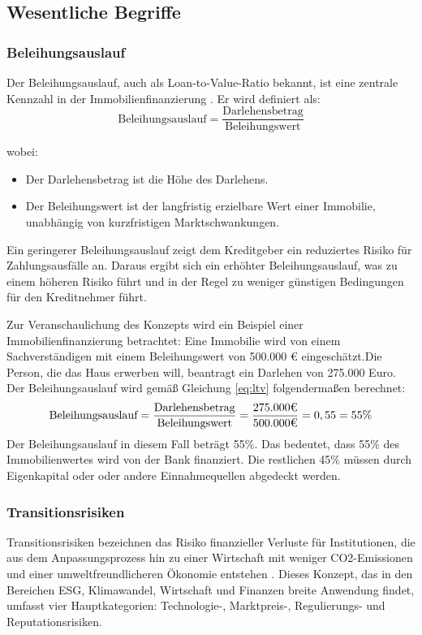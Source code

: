 
\subsection{Wesentliche Begriffe}
\subsubsection{Beleihungsauslauf}
Der Beleihungsauslauf, auch als Loan-to-Value-Ratio bekannt, ist eine zentrale Kennzahl in der Immobilienfinanzierung \parencite{BelWertV_3}. Er wird definiert als:
\begin{equation}
    \text{Beleihungsauslauf} = \frac{\text{Darlehensbetrag}}{\text{Beleihungswert}}
    \label{eq:ltv}
\end{equation}

\noindent wobei:
\begin{itemize}
    \item Der Darlehensbetrag ist die Höhe des Darlehens.
    \item Der Beleihungswert ist der langfristig erzielbare Wert einer Immobilie, unabhängig von kurzfristigen Marktschwankungen.
\end{itemize}

Ein geringerer Beleihungsauslauf zeigt dem Kreditgeber ein reduziertes Risiko für Zahlungsausfälle an. Daraus ergibt sich ein erhöhter Beleihungsauslauf, was zu einem höheren Risiko führt und in der Regel zu weniger günstigen Bedingungen für den Kreditnehmer führt.

Zur Veranschaulichung des Konzepts wird ein Beispiel einer Immobilienfinanzierung betrachtet:
Eine Immobilie wird von einem Sachverständigen mit einem Beleihungswert von 500.000 € eingeschätzt.Die Person, die das Haus erwerben will, beantragt ein Darlehen von 275.000 Euro.
Der Beleihungsauslauf wird gemäß Gleichung \ref{eq:ltv} folgendermaßen berechnet:
\begin{equation}
    \text{Beleihungsauslauf} = \frac{\text{Darlehensbetrag}}{\text{Beleihungswert}} = \frac{275.000 \mbox{\texteuro}}{500.000 \mbox{\texteuro}} = 0,55 = 55\%
\end{equation}
Der Beleihungsauslauf in diesem Fall beträgt 55\%. Das bedeutet, dass 55\% des Immobilienwertes wird von der Bank finanziert. Die restlichen 45\% müssen durch Eigenkapital oder oder andere Einnahmequellen abgedeckt werden.
\subsubsection{Transitionsrisiken}
Transitionsrisiken bezeichnen das Risiko finanzieller Verluste für Institutionen, die aus dem Anpassungsprozess hin zu einer Wirtschaft mit weniger CO2-Emissionen und einer umweltfreundlicheren Ökonomie entstehen \parencite{ecb2020climate}. Dieses Konzept, das in den Bereichen ESG, Klimawandel, Wirtschaft und Finanzen breite Anwendung findet, umfasst vier Hauptkategorien: Technologie-, Marktpreis-, Regulierungs- und Reputationsrisiken.

